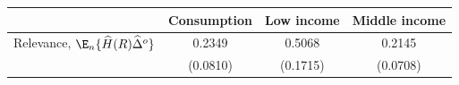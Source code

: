 \begin{threeparttable}
\begin{tabular}{l | ccc}
\toprule
 & \multicolumn{1}{c}{Consumption} & \multicolumn{1}{c}{Low income} & \multicolumn{1}{c}{Middle income} \\
\midrule
  Relevance, $\E_n\{\widehat{H}(R) \widehat{\Delta}^o\}$ & 0.2349 & 0.5068 & 0.2145 \\
           & (0.0810) & (0.1715) & (0.0708) \\
\bottomrule
\end{tabular}
\end{threeparttable}
